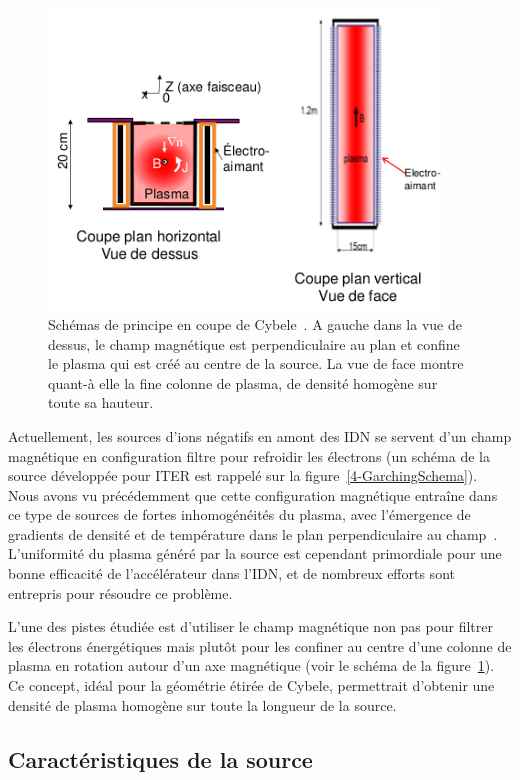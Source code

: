 \begin{refsection}
\begin{figure}[!htbp]
  \centering
    \includegraphics[height=8cm]{figures/4-cybeleSchema.png}
    \caption{Schémas de principe en coupe de Cybele~\parencite{SimoninHDR}. A
    gauche dans la vue de dessus, le champ magnétique est perpendiculaire au plan et confine le
plasma qui est créé au centre de la source. La vue de face montre quant-à elle
la fine colonne de plasma, de densité homogène sur toute sa hauteur.
\label{4-cybeleSchema}}
\end{figure}	

Actuellement, les sources d'ions négatifs en amont des IDN se servent d'un champ
magnétique en configuration filtre pour refroidir les électrons (un schéma de la
source développée pour ITER est rappelé sur la figure~\ref{4-GarchingSchema}).
Nous avons vu précédemment que cette configuration magnétique entraîne
dans ce type de sources de fortes inhomogénéités du plasma, avec l'émergence de
gradients de densité et de température dans le plan
perpendiculaire au champ~\parencite{Fantz,Kolev}.
L'uniformité du plasma généré par la source est cependant primordiale pour une
bonne efficacité de l'accélérateur dans l'IDN, et de nombreux efforts sont
entrepris pour résoudre ce problème.

L'une des pistes étudiée est d'utiliser le champ magnétique non pas pour
filtrer les électrons énergétiques mais plutôt pour les confiner au centre
d'une colonne de plasma en rotation autour d'un axe magnétique (voir le schéma
de la figure~\ref{4-cybeleSchema}). Ce concept,
idéal pour la géométrie étirée de Cybele, permettrait d'obtenir une densité de
plasma homogène sur toute la longueur de la source. 

\subsection{Caractéristiques de la source}


\end{refsection}
